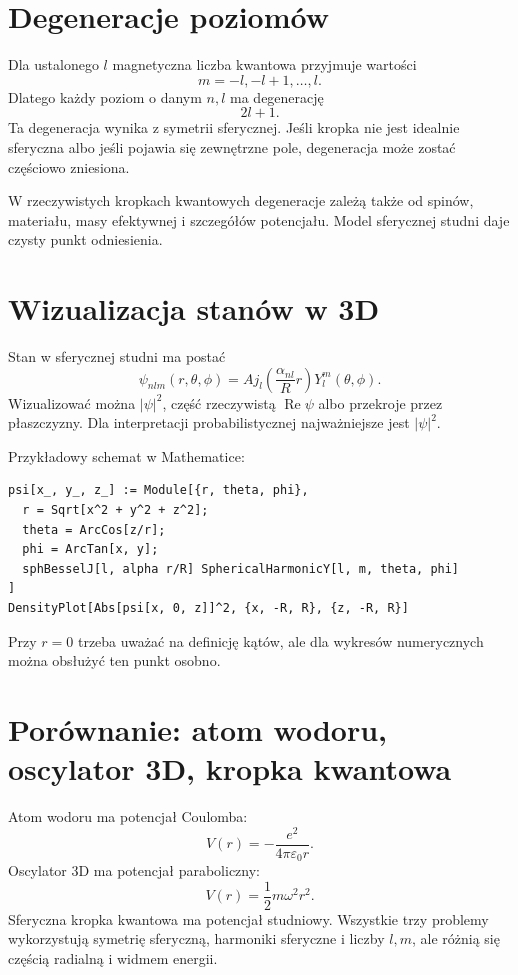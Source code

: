 \section{Degeneracje poziomów}

Dla ustalonego \(l\) magnetyczna liczba kwantowa przyjmuje wartości
\begin{equation}
    m=-l,-l+1,\ldots,l.
\end{equation}
Dlatego każdy poziom o danym \(n,l\) ma degenerację
\begin{equation}
    2l+1.
\end{equation}
Ta degeneracja wynika z symetrii sferycznej. Jeśli kropka nie jest idealnie sferyczna albo jeśli pojawia się zewnętrzne pole, degeneracja może zostać częściowo zniesiona.

W rzeczywistych kropkach kwantowych degeneracje zależą także od spinów, materiału, masy efektywnej i szczegółów potencjału. Model sferycznej studni daje czysty punkt odniesienia.

\section{Wizualizacja stanów w 3D}

Stan w sferycznej studni ma postać
\begin{equation}
    \psi_{nlm}(r,\theta,\phi)=A j_l\left(\frac{\alpha_{nl}}{R}r\right)Y_l^m(\theta,\phi).
\end{equation}
Wizualizować można \(|\psi|^2\), część rzeczywistą \(\operatorname{Re}\psi\) albo przekroje przez płaszczyzny. Dla interpretacji probabilistycznej najważniejsze jest \(|\psi|^2\).

Przykładowy schemat w Mathematice:
\begin{verbatim}
psi[x_, y_, z_] := Module[{r, theta, phi},
  r = Sqrt[x^2 + y^2 + z^2];
  theta = ArcCos[z/r];
  phi = ArcTan[x, y];
  sphBesselJ[l, alpha r/R] SphericalHarmonicY[l, m, theta, phi]
]
DensityPlot[Abs[psi[x, 0, z]]^2, {x, -R, R}, {z, -R, R}]
\end{verbatim}
Przy \(r=0\) trzeba uważać na definicję kątów, ale dla wykresów numerycznych można obsłużyć ten punkt osobno.

\section{Porównanie: atom wodoru, oscylator 3D, kropka kwantowa}

Atom wodoru ma potencjał Coulomba:
\begin{equation}
    V(r)=-\frac{e^2}{4\pi\varepsilon_0 r}.
\end{equation}
Oscylator 3D ma potencjał paraboliczny:
\begin{equation}
    V(r)=\frac{1}{2}m\omega^2r^2.
\end{equation}
Sferyczna kropka kwantowa ma potencjał studniowy. Wszystkie trzy problemy wykorzystują symetrię sferyczną, harmoniki sferyczne i liczby \(l,m\), ale różnią się częścią radialną i widmem energii.

